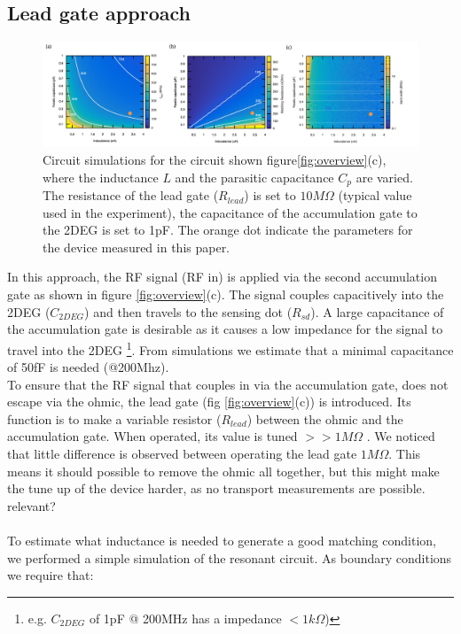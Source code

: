 \documentclass{article}
\begin{document}
\subsection{Lead gate approach} %
	\label{sub:lead_gate_approach}
	\begin{figure}
		\includegraphics[width=\textwidth]{Illustrations/Theory_figure/theory_delft_v2.pdf}
		\caption{Circuit simulations for the circuit shown figure\ref{fig:overview}(c), where the inductance $L$ and the parasitic capacitance $C_p$ are varied. The resistance of the lead gate ($R_{lead}$) is set to $10M\Omega$ (typical value used in the experiment), the capacitance of the accumulation gate to the 2DEG is set to 1pF. The orange dot indicate the parameters for the device measured in this paper.}
		\label{fig:lead_gate_theory}
	\end{figure}
	In this approach, the RF signal (RF in) is applied via the second accumulation gate as shown in figure \ref{fig:overview}(c). The signal couples capacitively into the 2DEG ($C_{2DEG}$) and then travels to the sensing dot ($R_{sd}$). A large capacitance of the accumulation gate is desirable as it causes a low impedance for the signal to travel into the 2DEG \footnote{e.g. $C_{2DEG}$ of 1pF @ 200MHz has a impedance $< 1k\Omega$)}. From simulations we estimate that a minimal capacitance of 50fF is needed (@200Mhz).
	\\
	To ensure that the RF signal that couples in via the accumulation gate, does not escape via the ohmic, the lead gate (fig \ref{fig:overview}(c)) is introduced.
	Its function is to make a variable resistor ($R_{lead}$) between the ohmic and the accumulation gate.
	When operated, its value is tuned $>>1M\Omega$ . We noticed that little difference is observed between operating the lead gate $1M\Omega$. This means it should possible to remove the ohmic all together, but this might make the tune up of the device harder, as no transport measurements are possible. \color{blue}relevant?\color{black}
	\\ \\
	To estimate what inductance is needed to generate a good matching condition, we performed a simple simulation of the resonant circuit. As boundary conditions we require that:
\end{document}
